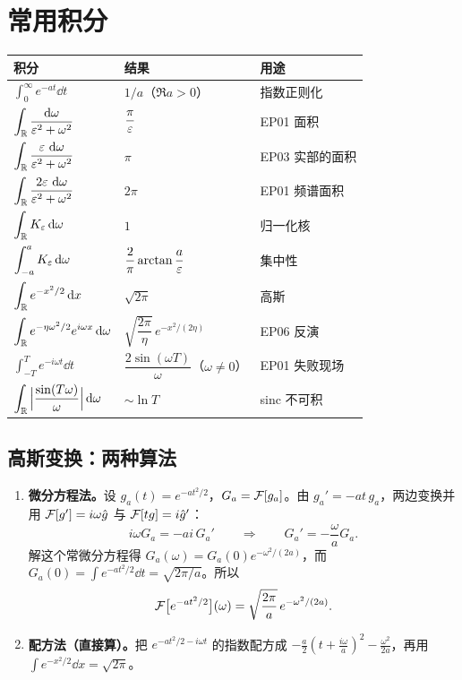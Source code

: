 \section{常用积分}

\begin{center}
\small
\renewcommand{\arraystretch}{1.5}
\begin{tabularx}{\textwidth}{@{}L{6.0cm}L{4.0cm}Y@{}}
\toprule
积分 & 结果 & 用途 \\
\midrule
$\displaystyle\int_{0}^{\infty}e^{-at}\dd t$ & $1/a$（$\Re a>0$） & 指数正则化 \\
$\displaystyle\int_{\mathbb{R}}\frac{\mathop{}\!\mathrm{d}\omega}{\varepsilon^{2}+\omega^{2}}$ & $\dfrac{\pi}{\varepsilon}$ & EP01 面积 \\
$\displaystyle\int_{\mathbb{R}}\frac{\varepsilon\,\mathop{}\!\mathrm{d}\omega}{\varepsilon^{2}+\omega^{2}}$ & $\pi$ & EP03 实部的面积 \\
$\displaystyle\int_{\mathbb{R}}\frac{2\varepsilon\,\mathop{}\!\mathrm{d}\omega}{\varepsilon^{2}+\omega^{2}}$ & $2\pi$ & EP01 频谱面积 \\
$\displaystyle\int_{\mathbb{R}}K_\varepsilon\mathop{}\!\mathrm{d}\omega$ & $1$ & 归一化核 \\
$\displaystyle\int_{-a}^{a}K_\varepsilon\mathop{}\!\mathrm{d}\omega$ & $\dfrac{2}{\pi}\arctan\dfrac{a}{\varepsilon}$ & 集中性 \\
$\displaystyle\int_{\mathbb{R}}e^{-x^{2}/2}\mathop{}\!\mathrm{d} x$ & $\sqrt{2\pi}$ & 高斯 \\
$\displaystyle\int_{\mathbb{R}}e^{-\eta\omega^{2}/2}e^{i\omega x}\mathop{}\!\mathrm{d}\omega$ & $\sqrt{\dfrac{2\pi}{\eta}}\,e^{-x^{2}/(2\eta)}$ & EP06 反演 \\
$\displaystyle\int_{-T}^{T}e^{-i\omega t}\dd t$ & $\dfrac{2\sin(\omega T)}{\omega}$（$\omega\neq0$） & EP01 失败现场 \\
$\displaystyle\int_{\mathbb{R}}\Big|\frac{\sin(T\omega)}{\omega}\Big|\mathop{}\!\mathrm{d}\omega$ & $\sim\ln T$ & sinc 不可积 \\
\bottomrule
\end{tabularx}
\end{center}

\subsection*{高斯变换：两种算法}

\begin{enumerate}[leftmargin=2em,itemsep=0.5em]
\item \textbf{微分方程法。}设 $g_a(t)=e^{-at^{2}/2}$，$G_a=\mathcal{F}[g_a]$。由 $g_a'=-at\,g_a$，两边变换并用 $\mathcal{F}[g']=i\omega\hat g$ 与 $\mathcal{F}[tg]=i\hat g'$：
\begin{equation}
i\omega G_a=-a i\,G_a'
\qquad\Longrightarrow\qquad
G_a'=-\frac{\omega}{a}G_a .
\end{equation}
解这个常微分方程得 $G_a(\omega)=G_a(0)e^{-\omega^{2}/(2a)}$，而 $G_a(0)=\int e^{-at^{2}/2}\dd t=\sqrt{2\pi/a}$。所以
\begin{equation}
\mathcal{F}\big[e^{-at^{2}/2}\big](\omega)=\sqrt{\frac{2\pi}{a}}\,e^{-\omega^{2}/(2a)} .
\end{equation}
\item \textbf{配方法（直接算）。}把 $e^{-at^{2}/2-i\omega t}$ 的指数配方成 $-\frac{a}{2}\left(t+\frac{i\omega}{a}\right)^{2}-\frac{\omega^{2}}{2a}$，再用 $\int e^{-x^{2}/2}\dd x=\sqrt{2\pi}$。
\end{enumerate}


